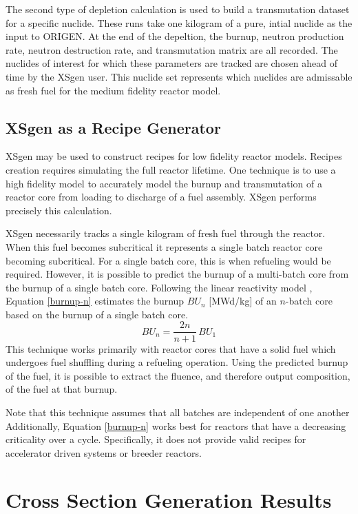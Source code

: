 \documentclass{article}
\begin{document}
The second type of depletion calculation is used to build a transmutation dataset for a
specific nuclide. These runs take one kilogram of a pure, intial nuclide as the input to
ORIGEN. At the end of the depeltion, the burnup, neutron production rate, neutron
destruction rate, and transmutation matrix are all recorded. The nuclides of interest
for which these parameters are tracked are chosen ahead of time by the XSgen user.
This nuclide set represents which nuclides are admissable as fresh fuel for the medium
fidelity reactor model.

\subsection{XSgen as a Recipe Generator}

XSgen may be used to construct recipes for low fidelity reactor models. Recipes creation
requires simulating the full reactor lifetime. One technique is to use a high fidelity
model to accurately model the burnup and transmutation of a reactor core from loading to
discharge of a fuel assembly. XSgen performs precisely this calculation.

XSgen necessarily tracks a single kilogram of fresh fuel through the reactor. When this
fuel becomes subcritical it represents a single batch reactor core becoming subcritical.
For a single batch core, this is when refueling would be required. However, it is possible
to predict the burnup of a multi-batch core from the burnup of a single batch core.
Following the linear reactivity model \cite{linear}, Equation \ref{burnup-n} estimates the burnup
$BU_n$ [MWd/kg] of an $n$-batch core based on the burnup of a single batch core.
\begin{equation}
\label{burnup-n}
BU_n = \frac{2n}{n+1} \, BU_1
\end{equation}
This technique works primarily with reactor cores that have a solid fuel which undergoes
fuel shuffling during a refueling operation. Using the predicted burnup of the fuel,
it is possible to extract the fluence, and therefore output composition,
of the fuel at that burnup\cite{brightlite}\cite{linear}. 

Note that this technique assumes that all batches are independent of one another
Additionally, Equation \ref{burnup-n} works best for reactors that have a decreasing
criticality over a cycle. Specifically, it does not provide valid recipes for accelerator
driven systems or breeder reactors.

\section{Cross Section Generation Results}
\end{document}
